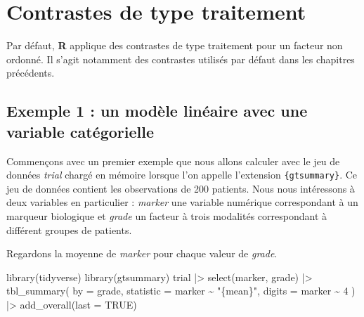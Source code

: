 \documentclass[
  letterpaper,
  DIV=11,
  numbers=noendperiod,
  oneside]{scrreprt}
\newenvironment{Shaded}{\begin{snugshade}}{\end{snugshade}}
\newcommand{\AttributeTok}[1]{\textcolor[rgb]{0.40,0.45,0.13}{#1}}
\newcommand{\ConstantTok}[1]{\textcolor[rgb]{0.56,0.35,0.01}{#1}}
\newcommand{\DecValTok}[1]{\textcolor[rgb]{0.68,0.00,0.00}{#1}}
\newcommand{\FunctionTok}[1]{\textcolor[rgb]{0.28,0.35,0.67}{#1}}
\newcommand{\NormalTok}[1]{\textcolor[rgb]{0.00,0.23,0.31}{#1}}
\newcommand{\SpecialCharTok}[1]{\textcolor[rgb]{0.37,0.37,0.37}{#1}}
\newcommand{\StringTok}[1]{\textcolor[rgb]{0.13,0.47,0.30}{#1}}
\begin{document}
\hypertarget{contrastes-de-type-traitement}{%
\section{Contrastes de type
traitement}\label{contrastes-de-type-traitement}}

Par défaut, \textbf{R} applique des contrastes de type traitement pour
un facteur non ordonné. Il s'agit notamment des contrastes utilisés par
défaut dans les chapitres précédents.

\hypertarget{exemple-1-un-moduxe8le-linuxe9aire-avec-une-variable-catuxe9gorielle}{%
\subsection{Exemple 1 : un modèle linéaire avec une variable
catégorielle}\label{exemple-1-un-moduxe8le-linuxe9aire-avec-une-variable-catuxe9gorielle}}

Commençons avec un premier exemple que nous allons calculer avec le jeu
de données \emph{trial} chargé en mémoire lorsque l'on appelle
l'extension \texttt{\{gtsummary\}}. Ce jeu de données contient les
observations de 200 patients. Nous nous intéressons à deux variables en
particulier : \emph{marker} une variable numérique correspondant à un
marqueur biologique et \emph{grade} un facteur à trois modalités
correspondant à différent groupes de patients.

Regardons la moyenne de \emph{marker} pour chaque valeur de
\emph{grade}.

\begin{Shaded}
\begin{Highlighting}[]
\FunctionTok{library}\NormalTok{(tidyverse)}
\FunctionTok{library}\NormalTok{(gtsummary)}
\NormalTok{trial }\SpecialCharTok{|\textgreater{}}
  \FunctionTok{select}\NormalTok{(marker, grade) }\SpecialCharTok{|\textgreater{}}
  \FunctionTok{tbl\_summary}\NormalTok{(}
    \AttributeTok{by =}\NormalTok{ grade,}
    \AttributeTok{statistic =}\NormalTok{ marker }\SpecialCharTok{\textasciitilde{}} \StringTok{"\{mean\}"}\NormalTok{,}
    \AttributeTok{digits =}\NormalTok{ marker }\SpecialCharTok{\textasciitilde{}} \DecValTok{4}
\NormalTok{  ) }\SpecialCharTok{|\textgreater{}}
  \FunctionTok{add\_overall}\NormalTok{(}\AttributeTok{last =} \ConstantTok{TRUE}\NormalTok{)}
\end{Highlighting}
\end{Shaded}
\end{document}
